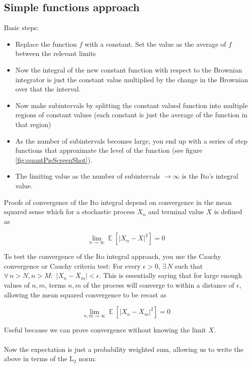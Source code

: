 \documentclass[12pt]{article}
\DeclareMathOperator*{\E}{\mathbb{E}}
\begin{document}
\subsection{Simple functions approach}

Basic steps:
\begin{itemize}
	\item Replace the function $f$ with a constant. Set the value as the average of $f$ between the relevant limits
	\item Now the integral of the new constant function with respect to the Brownian integrator is just the constant value multiplied by the change in the Brownian over that the interval.
	\item Now make subintervals by splitting the constant valued function into multiple regions of constant values (each constant is just the average of the function in that region)
	\item As the number of subintervals becomes large, you end up with a series of step functions that approximate the level of the function (see figure \ref{fig:quantPieScreenShot}).
	\item The limiting value as the number of subintervals $\to\infty$ is the Ito's integral value.
\end{itemize}

\noindent Proofs of convergence of the Ito integral depend on convergence in the mean squared sense which for a stochastic process $X_n$ and terminal value $X$ is defined as

\begin{equation}
	\lim\limits_{n\to\infty}\E\left[\left|X_n - X\right|^2\right]=0
\end{equation}

\noindent To test the convergence of the Ito integral approach, you use the Cauchy convergence or Cauchy criteria test: For every $\epsilon>0$, $\exists\,N$ such that $\forall\,n>N, n>M:$ $\left|X_n-X_m\right|<\epsilon$. This is essentially saying that for large enough values of $n,m$, terms $n,m$ of the process will converge to within a distance of $\epsilon$, allowing the mean squared convergence to be recast as

\begin{equation} \label{eq:meanSquaredCauchy}
	\lim\limits_{n,m\to\infty}\E\left[\left|X_n - X_m\right|^2\right]=0
\end{equation}

\noindent Useful because we can prove convergence without knowing the limit $X$.\\
\\
Now the expectation is just a probability weighted sum, allowing us to write the above in terms of the L$_2$ norm:
\end{document}
